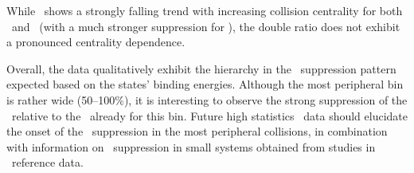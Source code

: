 While \Raa\ shows a strongly falling trend with increasing collision centrality
for both \PgUa\ and \PgUb\ (with a much stronger suppression for \PgUb), the
double ratio does not exhibit a pronounced centrality dependence.

Overall, the data qualitatively exhibit the hierarchy in the \PgUn\ suppression pattern
expected based on the states' binding energies. Although the most peripheral bin
is rather wide (50--100\%), it is interesting to observe the strong suppression of the
\PgUb\ relative to the \PgUa\ already for this bin. Future high statistics \PbPb\ data
should elucidate the onset of the \PgU\ suppression in the most peripheral collisions,
in combination with information on \PgU\ suppression in small systems obtained from
studies in \pPb\ reference data.

